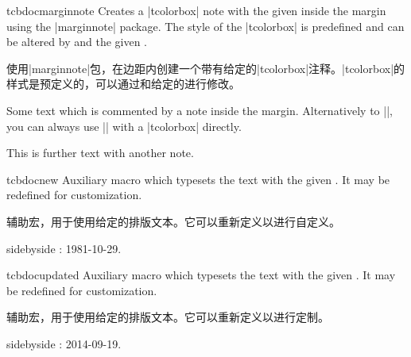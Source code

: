 \begin{docCommand}[doc new=2014-09-19]{tcbdocmarginnote}{}
Creates a |tcolorbox| note with the given  inside the margin using
the |marginnote| package. The style of the |tcolorbox| is predefined and can be
altered by  and the given .

使用|marginnote|包，在边距内创建一个带有给定的|tcolorbox|注释。|tcolorbox|的样式是预定义的，可以通过和给定的进行修改。
\begin{dispExample}
Some text
which is commented by a note inside the margin.
Alternatively to |\tcbdocmarginnote|, you can always use
|\marginnote| with a |tcolorbox| directly.\par
This is further text%
with another note.
\end{dispExample}
\end{docCommand}

\begin{docCommand}[doc new=2014-09-19]{tcbdocnew}{}
Auxiliary macro which typesets the  text with
the given . It may be redefined for customization.

辅助宏，用于使用给定的排版文本。它可以重新定义以进行自定义。 

\makeatletter\renewcommand*{\tcbdocnew}[1]{\kvtcb@text@new: #1}\makeatother%
\begin{dispExample*}{sidebyside}
\tcbdocnew{1981-10-29}.
\tcbdocmarginnote{\tcbdocnew{1978-02-09}}
\end{dispExample*}
\end{docCommand}

\begin{docCommand}[doc new=2014-09-19]{tcbdocupdated}{}
Auxiliary macro which typesets the  text with
the given . It may be redefined for customization.

辅助宏，用于使用给定的排版文本。它可以重新定义以进行定制。

\makeatletter\renewcommand*{\tcbdocupdated}[1]{\kvtcb@text@updated: #1}\makeatother%
\begin{dispExample*}{sidebyside}
\tcbdocupdated{2014-09-19}.
\end{dispExample*}
\end{docCommand}